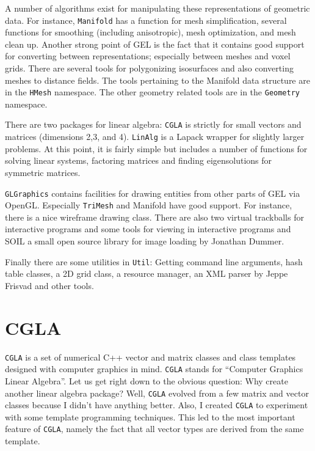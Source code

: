 \documentclass[a4paper]{article}
\begin{document}
A number of algorithms exist for manipulating these representations of geometric data. For instance, \texttt{Manifold} has a function for mesh simplification, several functions for smoothing (including anisotropic), mesh optimization, and mesh clean up.
Another strong point of GEL is the fact that it contains good support for converting between representations; especially between meshes and voxel grids. There are several tools for polygonizing isosurfaces and also converting meshes to distance fields.  The tools pertaining to the Manifold data structure are in the \texttt{HMesh} namespace. The other geometry related tools are in the \texttt{Geometry} namespace.

There are two packages for linear algebra: \texttt{CGLA} is strictly for small vectors and matrices (dimensions 2,3, and 4). \texttt{LinAlg} is a Lapack wrapper for slightly larger problems. At this point, it is fairly simple but includes a number of functions for solving linear systems, factoring matrices and finding eigensolutions for symmetric matrices.

\texttt{GLGraphics} contains facilities for drawing entities from other parts of GEL via OpenGL. Especially \texttt{TriMesh} and Manifold have good support. For instance, there is a nice wireframe drawing class. There are also two virtual trackballs for interactive programs and some tools for viewing in interactive programs and SOIL a small open source library for image loading by Jonathan Dummer.

Finally there are some utilities in \texttt{Util}: Getting command line arguments, hash table classes, a 2D grid class, a resource manager, an XML parser by Jeppe Frisvad and other tools.

\section{CGLA}

\texttt{CGLA} is a set of numerical C++ vector and matrix classes and class
templates designed with computer graphics in mind. \texttt{CGLA} stands for
``Computer Graphics Linear Algebra''. Let us get right down to the obvious question: Why create another
linear algebra package?
Well, \texttt{CGLA} evolved from a few matrix and vector classes because I
didn't have anything better. Also, I created \texttt{CGLA} to experiment with
some template programming techniques. This led to the most important
feature of \texttt{CGLA}, namely the fact that all vector types are derived
from the same template. 
\end{document}
